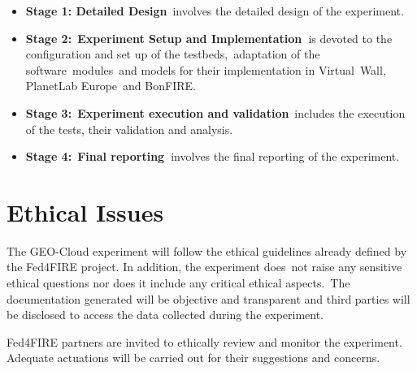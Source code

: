 \documentclass[a4paper]{article}
\newcommand\liststyleLFOxli{%
\renewcommand\labelitemi{[F0B7?]}
\renewcommand\labelitemii{o}
\renewcommand\labelitemiii{[F0A7?]}
\renewcommand\labelitemiv{[F0B7?]}
}
\begin{document}
\bigskip

\liststyleLFOxli
\begin{itemize}
\item \textbf{Stage 1: Detailed Design}\ involves the detailed design of
the experiment.
\end{itemize}

\bigskip

\liststyleLFOxli
\begin{itemize}
\item \textbf{Stage 2:}\ \textbf{Experiment Setup and
Implementation\ }is devoted to the configuration and set up of the
testbeds,\ adaptation of the software\ modules\ and models for their
implementation in Virtual\ Wall, PlanetLab Europe\ and BonFIRE.\ 
\end{itemize}

\bigskip

\liststyleLFOxli
\begin{itemize}
\item \textbf{Stage 3:}\ \textbf{Experiment execution and
validation}\ includes the execution of the tests, their validation and
analysis.\ 
\end{itemize}

\bigskip

\liststyleLFOxli
\begin{itemize}
\item \textbf{Stage 4:}\ \textbf{Final reporting\ }involves the final
reporting of the experiment.\ 
\end{itemize}

\bigskip


\bigskip

\section[Ethical Issues]{Ethical Issues}
\hypertarget{Toc378868693}{}
\bigskip

The GEO-Cloud experiment will follow the ethical guidelines already
defined by the Fed4FIRE project. In addition, the experiment does\ not
raise any sensitive ethical questions nor does it include any critical
ethical aspects.\ The documentation generated will be objective and
transparent and third parties will be disclosed to access the data
collected during the experiment.


\bigskip

Fed4FIRE partners are invited to ethically review and monitor the
experiment. Adequate actuations will be carried out for their
suggestions and concerns.
\end{document}
